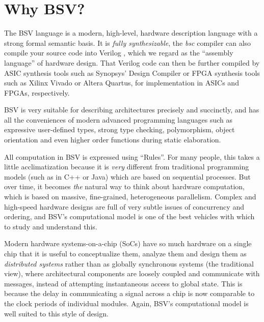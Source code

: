 

\chapter{Why BSV?}


\setcounter{page}{1}
\renewcommand{\thepage}{\Alph{chapter}-\arabic{page}}

\label{apx_Why_BSV}


The BSV language is a modern, high-level, hardware description
language with a strong formal semantic basis.  It is \emph{fully
synthesizable}, {\ie} the \emph{bsc} compiler can also compile your
source code into Verilog \cite{IEEEVerilog2005a}, which we regard as
the ``assembly language'' of hardware design.  That Verilog code can
then be further compiled by ASIC synthesis tools such as Synopsys'
Design Compiler or FPGA synthesis tools such as Xilinx Vivado or
Altera Quartus, for implementation in ASICs and FPGAs, respectively.

BSV is very suitable for describing architectures precisely and
succinctly, and has all the conveniences of modern advanced
programming languages such as expressive user-defined types, strong
type checking, polymorphism, object orientation and even higher order
functions during static elaboration.

All computation in BSV is expressed using ``Rules''.  For many people,
this takes a little acclimatization because it is \emph{very}
different from traditional programming models (such as in C++ or Java)
which are based on sequential processes.  But over time, it becomes
\emph{the} natural way to think about hardware computation, which is
based on massive, fine-grained, heterogeneous parallelism.  Complex
and high-speed hardware designs are full of very subtle issues of
concurrency and ordering, and BSV's computational model is one of the
best vehicles with which to study and understand this.

Modern hardware systems-on-a-chip (SoCs) have so much hardware on a
single chip that it is useful to conceptualize them, analyze them and
design them as \emph{distributed systems} rather than as globally
synchronous systems (the traditional view), {\ie} where architectural
components are loosely coupled and communicate with messages, instead
of attempting instantaneous access to global state.  This is because
the delay in communicating a signal across a chip is now comparable to
the clock periods of individual modules.  Again, BSV's computational
model is well suited to this style of design.

